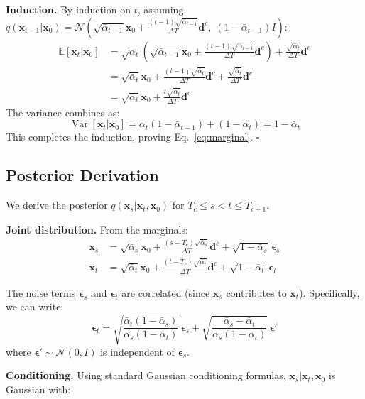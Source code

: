 \documentclass[10pt]{article}
\DeclareMathOperator{\Var}{Var}
\newcommand{\E}{\mathbb{E}}
\newcommand{\N}{\mathcal{N}}
\newcommand{\bx}{\bm{x}}
\newcommand{\beps}{\bm{\epsilon}}
\newcommand{\bd}{\bm{d}}
\begin{document}
\textbf{Induction.} By induction on $t$, assuming $q(\bx_{t-1}|\bx_0) = \N(\sqrt{\bar\alpha_{t-1}}\bx_0 + \frac{(t-1)\sqrt{\bar\alpha_{t-1}}}{\Delta T}\bd^c,\; (1-\bar\alpha_{t-1})I)$:
\begin{align}
    \E[\bx_t | \bx_0] &= \sqrt{\alpha_t}\left(\sqrt{\bar\alpha_{t-1}}\bx_0 + \frac{(t-1)\sqrt{\bar\alpha_{t-1}}}{\Delta T}\bd^c\right) + \frac{\sqrt{\bar\alpha_t}}{\Delta T}\bd^c \\
    &= \sqrt{\bar\alpha_t}\bx_0 + \frac{(t-1)\sqrt{\bar\alpha_t}}{\Delta T}\bd^c + \frac{\sqrt{\bar\alpha_t}}{\Delta T}\bd^c \\
    &= \sqrt{\bar\alpha_t}\bx_0 + \frac{t\sqrt{\bar\alpha_t}}{\Delta T}\bd^c
\end{align}
The variance combines as:
\begin{equation}
    \Var[\bx_t|\bx_0] = \alpha_t(1-\bar\alpha_{t-1}) + (1-\alpha_t) = 1 - \bar\alpha_t
\end{equation}
This completes the induction, proving Eq.~\eqref{eq:marginal}. $\square$

\subsection{Posterior Derivation}
\label{app:posterior}

We derive the posterior $q(\bx_s | \bx_t, \bx_0)$ for $T_c \leq s < t \leq T_{c+1}$.

\textbf{Joint distribution.} From the marginals:
\begin{align}
    \bx_s &= \sqrt{\bar\alpha_s}\bx_0 + \frac{(s-T_c)\sqrt{\bar\alpha_s}}{\Delta T}\bd^c + \sqrt{1-\bar\alpha_s}\, \beps_s \\
    \bx_t &= \sqrt{\bar\alpha_t}\bx_0 + \frac{(t-T_c)\sqrt{\bar\alpha_t}}{\Delta T}\bd^c + \sqrt{1-\bar\alpha_t}\, \beps_t
\end{align}

The noise terms $\beps_s$ and $\beps_t$ are correlated (since $\bx_s$ contributes to $\bx_t$).
Specifically, we can write:
\begin{equation}
    \beps_t = \sqrt{\frac{\bar\alpha_t(1-\bar\alpha_s)}{\bar\alpha_s(1-\bar\alpha_t)}}\, \beps_s + \sqrt{\frac{\bar\alpha_s - \bar\alpha_t}{\bar\alpha_s(1-\bar\alpha_t)}}\, \beps'
\end{equation}
where $\beps' \sim \N(0,I)$ is independent of $\beps_s$.

\textbf{Conditioning.} Using standard Gaussian conditioning formulas, $\bx_s | \bx_t, \bx_0$ is Gaussian with:
\end{document}
